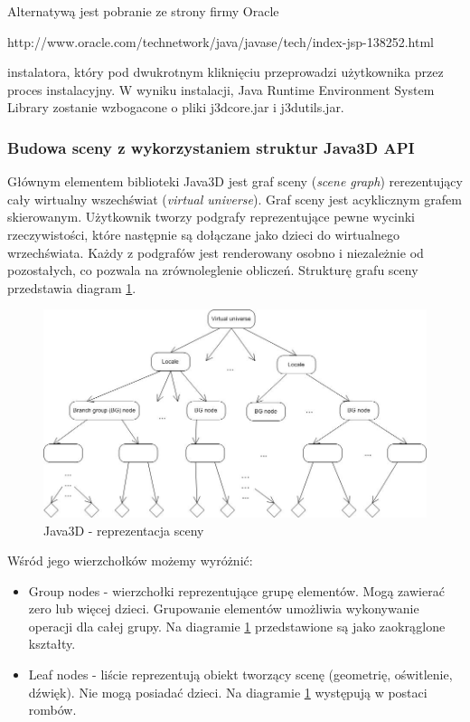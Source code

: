 Alternatywą jest pobranie ze strony firmy Oracle 
\begin{center}
http://www.oracle.com/technetwork/java/javase/tech/index-jsp-138252.html \\
\end{center}
instalatora, który pod dwukrotnym kliknięciu przeprowadzi użytkownika przez proces instalacyjny. 
W wyniku instalacji, Java Runtime Environment System Library zostanie wzbogacone o pliki j3dcore.jar i j3dutils.jar.
\subsubsection{Budowa sceny z wykorzystaniem struktur Java3D API}
Głównym elementem biblioteki Java3D jest graf sceny (\textit{scene graph}) rerezentujący cały wirtualny wszechświat (\textit{virtual universe}). Graf sceny jest acyklicznym grafem skierowanym.  Użytkownik tworzy podgrafy reprezentujące pewne wycinki rzeczywistości, które następnie są dołączane jako dzieci do wirtualnego wrzechświata. Każdy z podgrafów jest renderowany  osobno i niezależnie od pozostałych, co pozwala na zrównoleglenie obliczeń. Strukturę grafu sceny przedstawia diagram \ref{java3d_diagram_sceny}.
\begin{figure}
\begin {center}
\includegraphics[scale=0.75]{java3d_diagram_sceny.jpg} 
\caption {Java3D - reprezentacja sceny}
\label {java3d_diagram_sceny}
\end {center}
\end{figure}
 Wśród jego wierzchołków możemy wyróżnić:
\begin{itemize}
\item Group nodes - wierzchołki reprezentujące grupę elementów. Mogą zawierać zero lub więcej dzieci. Grupowanie elementów umożliwia wykonywanie operacji dla całej grupy. Na diagramie \ref{java3d_diagram_sceny} przedstawione są jako zaokrąglone kształty.
\item Leaf nodes - liście reprezentują obiekt tworzący scenę (geometrię, oświtlenie, dźwięk). Nie mogą posiadać dzieci. Na diagramie \ref{java3d_diagram_sceny} występują w postaci rombów.
\end{itemize}

